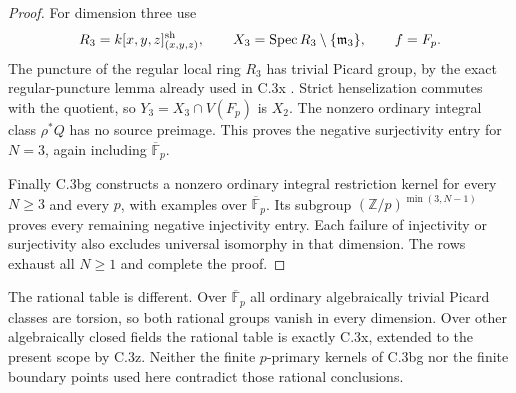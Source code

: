 \begin{proof}
For dimension three use
\[
 R_3=k[x,y,z]_{(x,y,z)}^{\rm sh},\qquad
 X_3=\operatorname{Spec}R_3\setminus\{\mathfrak m_3\},\qquad f=F_p.
\]
The puncture of the regular local ring $R_3$ has trivial Picard
group, by the exact regular-puncture lemma already used in C.3x
\citep[Lemma 52.27.5, Tag 0F2H]{D_StacksRegularPuncture}.
Strict henselization commutes with the quotient, so $Y_3=X_3\cap
V(F_p)$ is $X_2$. The nonzero ordinary integral class $\rho^*Q$
has no source preimage. This proves the negative surjectivity
entry for $N=3$, again including $\overline{\mathbb F}_p$.

Finally C.3bg constructs a nonzero ordinary integral restriction
kernel for every $N\ge3$ and every $p$, with examples over
$\overline{\mathbb F}_p$. Its subgroup
$(\mathbb Z/p)^{\min(3,N-1)}$ proves every remaining negative
injectivity entry. Each failure of injectivity or surjectivity
also excludes universal isomorphy in that dimension. The rows
exhaust all $N\ge1$ and complete the proof.
\end{proof}

The rational table is different. Over $\overline{\mathbb F}_p$
all ordinary algebraically trivial Picard classes are torsion,
so both rational groups vanish in every dimension. Over other
algebraically closed fields the rational table is exactly C.3x,
extended to the present scope by C.3z. Neither the finite
$p$-primary kernels of C.3bg nor the finite boundary points used
here contradict those rational conclusions.
